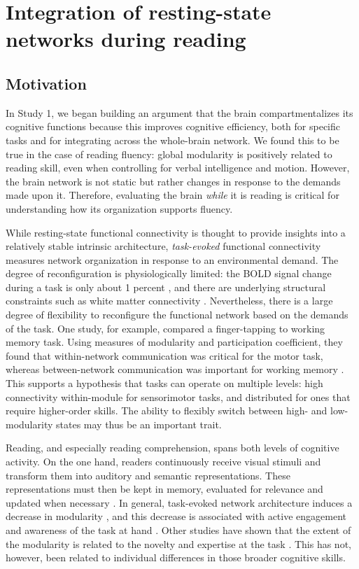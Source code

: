 \chapter{Integration of resting-state networks during reading}

\section{Motivation}

In Study 1, we began building an argument that the brain compartmentalizes its cognitive functions because this improves cognitive efficiency, both for specific tasks and for integrating across the whole-brain network. We found this to be true in the case of reading fluency: global modularity is positively related to reading skill, even when controlling for verbal intelligence and motion. However, the brain network is not static but rather  changes in response to the demands made upon it. Therefore, evaluating the brain \textit{while} it is reading is critical for understanding how its organization supports fluency. 

While resting-state functional connectivity is thought to provide insights into a relatively stable intrinsic architecture, \textit{task-evoked} functional connectivity measures network organization in response to an environmental demand. The degree of reconfiguration is physiologically limited: the BOLD signal change during a task is only about 1 percent \citep{Fox2007}, and there are underlying structural constraints such as white matter connectivity \citep{Sui2014}. Nevertheless, there is a large degree of flexibility to reconfigure the functional network based on the demands of the task. One study, for example, compared a finger-tapping to working memory task. Using measures of modularity and participation coefficient, they found that within-network communication was critical for the motor task, whereas between-network communication was important for working memory \citep{Cohen2016}. This supports a hypothesis that tasks can operate on multiple levels: high connectivity within-module for sensorimotor tasks, and distributed for ones that require higher-order skills. The ability to flexibly switch between high- and low-modularity states may thus be an important trait.

Reading, and especially reading comprehension, spans both levels of cognitive activity. On the one hand, readers continuously receive visual stimuli and transform them into auditory and semantic representations. These representations must then be kept in memory, evaluated for relevance and updated when necessary \citep{Maguire1999}. In general, task-evoked network architecture induces a decrease in modularity \citep{Cole2014}, and this decrease is associated with active engagement and awareness of the task at hand \citep{Godwin2015}. Other studies have shown that the extent of the modularity is related to the novelty and expertise at the task \citep{Bassett2015}. This has not, however, been related to individual differences in those broader cognitive skills.

